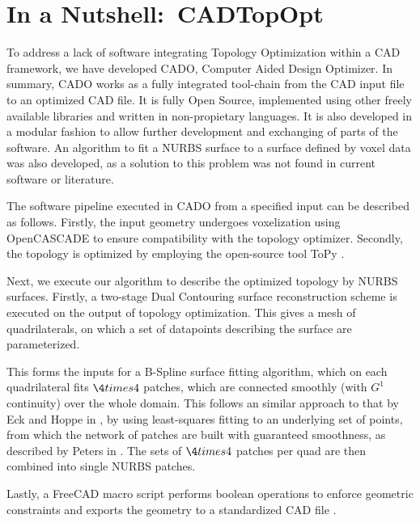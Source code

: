 \section{In a Nutshell:\ \acl{CADTopOpt}}
\label{sec:nutshell}
To address a lack of software integrating Topology Optimization within a CAD framework, we have developed CADO, Computer Aided Design Optimizer. In summary, CADO works as a fully integrated tool-chain from the CAD input file to an optimized CAD file. It is fully Open Source, implemented using other freely available libraries and written in non-propietary languages. It is also developed in a modular fashion to allow further development and exchanging of parts of the software. An algorithm to fit a NURBS surface to a surface defined by voxel data was also developed, as a solution to this problem was not found in current software or literature.

The software pipeline executed in CADO from a specified input can be described as follows. Firstly, the input geometry undergoes voxelization using OpenCASCADE to ensure compatibility with the topology optimizer. Secondly, the topology is optimized by employing the open-source tool ToPy \cite{ToPy}.  

Next, we execute our algorithm to describe the optimized topology by NURBS surfaces. Firstly, a two-stage Dual Contouring surface reconstruction scheme is executed on the output of topology optimization. This gives a mesh of quadrilaterals, on which a set of datapoints describing the surface are parameterized.

This forms the inputs for a B-Spline surface fitting algorithm, which on each quadrilateral fits $\4times4$ \Bezier patches, which are connected smoothly (with $G^1$ continuity) over the whole domain. This follows an similar approach to that by Eck and Hoppe in \cite{eck1996automatic}, by using least-squares fitting to an underlying set of points, from which the network of \Bez patches are built with guaranteed smoothness, as described by Peters in \cite{peters1992constructing}. The sets of $\4times4$ \Bezier patches per quad are then combined into single NURBS patches.

Lastly, a FreeCAD macro script performs boolean operations to enforce geometric constraints and exports the geometry to a standardized CAD file \cite{FreeCAD}.

